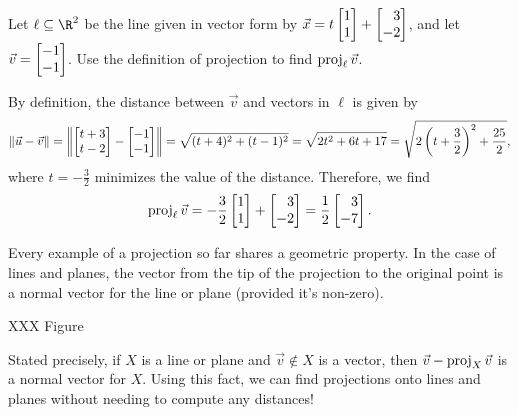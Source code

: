 \begin{example}
	Let $\ell\subseteq \R^2$ be the line given in vector form by $\vec x=t\mat{1\\1}+\mat{3\\-2}$,
	and let $\vec v=\mat{-1\\-1}$. Use the definition of projection to find $\operatorname{proj}_\ell \vec v$.

	By definition, the distance between $\vec v$ and vectors in $\ell$ is given by
	\[
	    \Norm{\vec u-\vec v}=\norm*{\mat{t+3\\t-2}-\mat{-1\\-1}} = \sqrt{(t+4)^2+(t-1)^2}=\sqrt{2t^2+6t+17}=\sqrt{2\left(t+\frac{3}{2}\right)^2+\frac{25}{2}},
	\]
	where $t=-\frac{3}{2}$ minimizes the value of the distance. Therefore, we find 
	\[
	    \Proj_\ell \vec v=-\frac{3}{2}\mat{1\\1}+\mat{3\\-2}=\frac{1}{2}\mat{3\\-7}.
	\]
\end{example}

Every example of a projection so far shares a geometric property. In the case of lines and planes,
the vector from the tip of the projection to the original point is a normal vector for the line or plane (provided it's non-zero).

XXX Figure

Stated precisely, if $X$ is a line or plane and $\vec v\notin X$ is a vector, then $\vec v-\operatorname{proj}_X\vec v$ is a
normal vector for $X$. Using this fact, we can find projections onto lines and planes without needing to compute
any distances!

